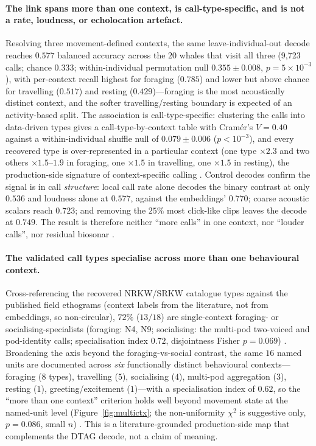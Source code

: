 \documentclass[11pt]{article}
\begin{document}
\paragraph{The link spans more than one context, is call-type-specific, and is not a rate,
loudness, or echolocation artefact.} Resolving three movement-defined contexts, the same
leave-individual-out decode reaches $0.577$ balanced accuracy across the $20$ whales that
visit all three (9{,}723 calls; chance $0.333$; within-individual permutation null
$0.355 \pm 0.008$, $p=5\times10^{-3}$), with per-context recall highest for foraging
($0.785$) and lower but above chance for travelling ($0.517$) and resting ($0.429$)---foraging
is the most acoustically distinct context, and the softer travelling/resting boundary is
expected of an activity-based split. The association is call-type-specific: clustering the
calls into data-driven types gives a call-type-by-context table with Cram\'er's $V=0.40$
against a within-individual shuffle null of $0.079 \pm 0.006$ ($p<10^{-3}$), and every
recovered type is over-represented in a particular context (one type $\times 2.3$ and two
others $\times 1.5$--$1.9$ in foraging, one $\times 1.5$ in travelling, one $\times 1.5$ in
resting), the production-side signature of context-specific calling \citep{ford1989,foote2008}.
Control decodes confirm the signal is in call \emph{structure}: local call rate alone decodes
the binary contrast at only $0.536$ and loudness alone at $0.577$, against the embeddings'
$0.770$; coarse acoustic scalars reach $0.723$; and removing the $25\%$ most click-like clips
leaves the decode at $0.749$. The result is therefore neither ``more calls'' in one context,
nor ``louder calls'', nor residual biosonar \citep{wilson2006}.

\paragraph{The validated call types specialise across more than one behavioural context.}
Cross-referencing the recovered NRKW/SRKW catalogue types against the published field
ethograms (context labels from the literature, not from embeddings, so non-circular), $72\%$
($13/18$) are single-context foraging- or socialising-specialists (foraging: N4, N9;
socialising: the multi-pod two-voiced and pod-identity calls; specialisation index $0.72$,
disjointness Fisher $p=0.069$) \citep{ford1989,foote2008}. Broadening the axis beyond the
foraging-vs-social contrast, the same $16$ named units are documented across \emph{six}
functionally distinct behavioural contexts---foraging ($8$ types), travelling ($5$),
socialising ($4$), multi-pod aggregation ($3$), resting ($1$), greeting/excitement
($1$)---with a specialisation index of $0.62$, so the ``more than one context'' criterion
holds well beyond movement state at the named-unit level (Figure~\ref{fig:multictx}; the
non-uniformity $\chi^2$ is suggestive only, $p=0.086$, small $n$)
\citep{ford1989,foote2008,riesch2008,yurk2002}. This is a literature-grounded production-side
map that complements the DTAG decode, not a claim of meaning.
\end{document}
